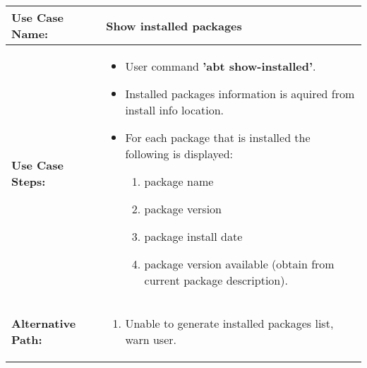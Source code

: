\medskip

\begin{tabularx}{\linewidth}{|l|X|}
\hline
\textbf{Use Case Name:} & \textbf{Show installed packages} \\
\hline
\textbf{Use Case Steps:} & 
\begin{minipage}{\linewidth} 
  \vspace{0.05em}
  \begin{itemize}
    \item User command \textbf{'abt show-installed'}.
    \item Installed packages information is aquired from install info location.
    \item For each package that is installed the following is displayed:
    \begin{enumerate}
      \item package name
      \item package version
      \item package install date
      \item package version available (obtain from current package description).
    \end{enumerate}
  \end{itemize}
  \vspace{0.05em}
\end{minipage}
\\
\hline 
\textbf{Alternative Path:} &
\begin{minipage}{\linewidth}
  \vspace{0.05em} 
  \begin{enumerate}
    \item Unable to generate installed packages list, warn user.
  \end{enumerate}
  \vspace{0.05em} 
\end{minipage}
\\
\hline
\end{tabularx}

\newpage

